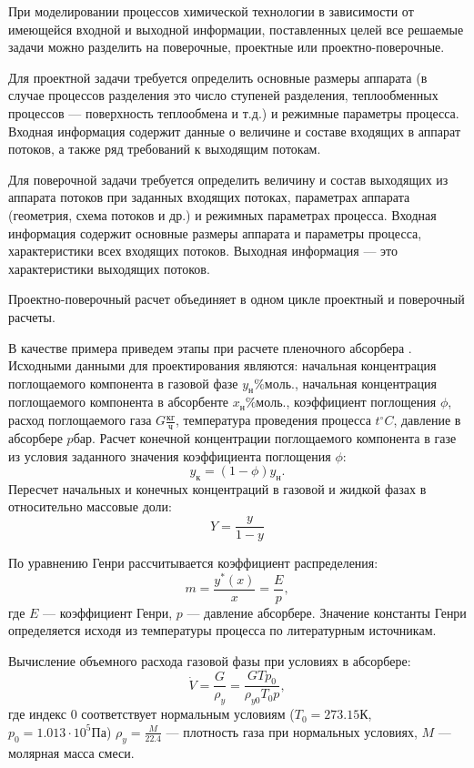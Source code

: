 При моделировании процессов химической технологии в зависимости от имеющейся входной и выходной информации, поставленных целей все решаемые задачи можно разделить на поверочные, проектные или проектно-поверочные.

Для проектной задачи требуется определить основные размеры аппарата (в случае процессов разделения это число ступеней разделения, теплообменных процессов --- поверхность теплообмена и т.д.) и режимные параметры процесса. Входная информация содержит данные о величине и составе входящих в аппарат потоков, а также ряд требований к выходящим потокам. 

Для поверочной задачи требуется определить величину и состав выходящих из аппарата потоков при заданных входящих потоках, параметрах аппарата (геометрия, схема потоков и др.) и режимных параметрах процесса. Входная информация содержит основные размеры аппарата и параметры процесса, характеристики всех входящих потоков. Выходная информация --- это характеристики выходящих потоков.

Проектно-поверочный расчет объединяет в одном цикле проектный и поверочный расчеты. 

В качестве примера приведем этапы при расчете пленочного абсорбера \cite{pavlov}. Исходными данными для проектирования являются: начальная концентрация поглощаемого компонента в газовой фазе $y_н \% моль.$, начальная концентрация поглощаемого компонента в абсорбенте $x_н \% моль.$, коэффициент поглощения $\phi$, расход поглощаемого газа $G \frac{кг}{ч}$, температура проведения процесса $t ^\circ C$, давление в абсорбере $p бар$.
Расчет конечной концентрации поглощаемого компонента в газе из условия заданного значения коэффициента поглощения $\phi$:
\begin{equation}
	y_к = (1-\phi) y_н.
\end{equation}
Пересчет начальных и конечных концентраций в газовой и жидкой фазах в относительно массовые доли:
\begin{equation}
	Y= \dfrac{y}{1-y}
\end{equation}

По уравнению Генри рассчитывается коэффициент распределения:
\begin{equation}
	 m = \dfrac{y^*(x)}{x}=\dfrac{E}{p},
\end{equation} 
где $E$ --- коэффициент Генри, $p$ --- давление  абсорбере. Значение константы Генри определяется исходя из температуры процесса по литературным источникам.

Вычисление объемного расхода газовой фазы при условиях в абсорбере:
\begin{equation}
	\dot{V} = \dfrac{G} {\rho_y} = \dfrac{G T  p_0}{\rho_{y0} T_0 p },
\end{equation}
где индекс $0$ соответствует нормальным условиям ($T_0=273.15 К$, $p_0 = 1.013 \cdot 10^5 Па$) $\rho_y=\frac{M}{22.4}$ --- плотность газа при нормальных условиях, $M$ --- молярная масса смеси.

